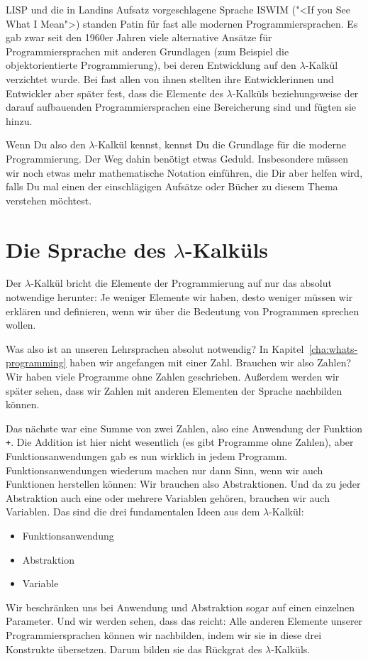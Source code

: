LISP und die in Landins Aufsatz vorgeschlagene Sprache ISWIM ("<If you
See What I Mean">) standen Patin für fast alle modernen
Programmiersprachen.  Es gab zwar seit den 1960er Jahren viele
alternative Ansätze für Programmiersprachen mit anderen Grundlagen
(zum Beispiel die objektorientierte Programmierung), bei deren
Entwicklung auf den $\lambda$-Kalkül verzichtet wurde.  Bei fast allen
von ihnen stellten ihre Entwicklerinnen und Entwickler aber später
fest, dass die Elemente des $\lambda$-Kalküls beziehungsweise der
darauf aufbauenden Programmiersprachen eine Bereicherung sind und
fügten sie hinzu.

Wenn Du also den $\lambda$-Kalkül kennst, kennst Du die Grundlage für
die moderne Programmierung.  Der Weg dahin benötigt etwas Geduld.
Insbesondere müssen wir noch etwas mehr mathematische Notation
einführen, die Dir aber helfen wird, falls Du mal einen der
einschlägigen Aufsätze oder Bücher zu diesem Thema verstehen möchtest.

\section{Die Sprache des $\lambda$-Kalküls}
\label{sec:sprache}

Der $\lambda$-Kalkül bricht die Elemente der Programmierung auf nur
das absolut notwendige herunter: Je weniger Elemente wir haben, desto
weniger müssen wir erklären und definieren, wenn wir über die
Bedeutung von Programmen sprechen wollen.

Was also ist an unseren Lehrsprachen absolut notwendig?  In
Kapitel~\ref{cha:whats-programming} haben wir angefangen mit einer
Zahl.  Brauchen wir also Zahlen?  Wir haben viele Programme ohne
Zahlen geschrieben.  Außerdem werden wir später sehen, dass wir
Zahlen mit anderen Elementen der Sprache nachbilden können.

Das nächste war eine Summe von zwei Zahlen, also eine Anwendung der
Funktion \lstinline{+}.  Die Addition ist hier nicht wesentlich (es
gibt Programme ohne Zahlen), aber Funktionsanwendungen gab es nun
wirklich in jedem Programm.  Funktionsanwendungen wiederum machen nur
dann Sinn, wenn wir auch Funktionen herstellen können: Wir brauchen
also Abstraktionen.  Und da zu jeder Abstraktion auch eine oder
mehrere Variablen gehören, brauchen wir auch Variablen.  Das sind die
drei fundamentalen Ideen aus dem $\lambda$-Kalkül:
%
\begin{itemize}
\item Funktionsanwendung
\item Abstraktion
\item Variable
\end{itemize}
%
Wir beschränken uns bei Anwendung und Abstraktion sogar auf einen
einzelnen Parameter.  Und wir werden sehen, dass das reicht: Alle
anderen Elemente unserer Programmiersprachen können wir nachbilden,
indem wir sie in diese drei Konstrukte übersetzen.  Darum bilden sie
das Rückgrat des $\lambda$-Kalküls.

